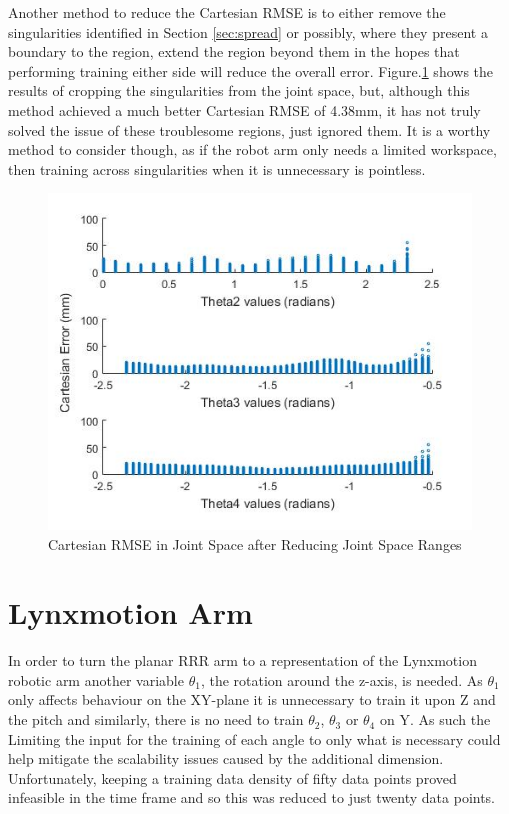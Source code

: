 \documentclass[11.5pt, twoside, a4paper]{article}
\begin{document}
Another method to reduce the Cartesian RMSE is to either remove the singularities identified in Section \ref{sec:spread} or possibly, where they present a boundary to the region, extend the region beyond them in the hopes that performing training either side will reduce the overall error. Figure.\ref{fig:rangereduce} shows the results of cropping the singularities from the joint space, but, although this method achieved a much better Cartesian RMSE of 4.38mm, it has not truly solved the issue of these troublesome regions, just ignored them. It is a worthy method to consider though, as if the robot arm only needs a limited workspace, then training across singularities when it is unnecessary is pointless. 

\begin{figure}
\includegraphics[width=\linewidth]{ReducedRanges.jpg}
\caption{Cartesian RMSE in Joint Space after Reducing Joint Space Ranges\label{fig:rangereduce}}
\end{figure}

\section{Lynxmotion Arm}

In order to turn the planar RRR arm to a representation of the Lynxmotion robotic arm another variable $\theta_1$, the rotation around the z-axis, is needed. As $\theta_1$ only affects behaviour on the XY-plane it is unnecessary to train it upon Z and the pitch and similarly, there is no need to train $\theta_2$, $\theta_3$ or $\theta_4$ on Y. As such the  Limiting the input for the training of each angle to only what is necessary could help mitigate the scalability issues caused by the additional dimension. Unfortunately, keeping a training data density of fifty data points proved infeasible in the time frame and so this was reduced to just twenty data points.
\end{document}
